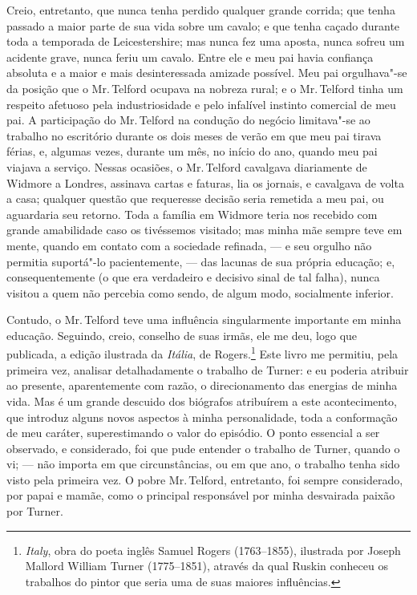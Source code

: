 Creio, entretanto, que nunca tenha perdido qualquer grande corrida;
que tenha passado a maior parte de sua vida sobre um cavalo; e que tenha
caçado durante toda a temporada de Leicestershire; mas nunca fez uma
aposta, nunca sofreu um acidente grave, nunca feriu um cavalo. Entre ele
e meu pai havia confiança absoluta e a maior e mais desinteressada
amizade possível. Meu pai orgulhava"-se da posição que o Mr.\,Telford
ocupava na nobreza rural; e o Mr.\,Telford tinha um respeito afetuoso pela
industriosidade e pelo infalível instinto comercial de meu pai. A
participação do Mr.\,Telford na condução do negócio limitava"-se ao
trabalho no escritório durante os dois meses de verão em que meu pai
tirava férias, e, algumas vezes, durante um mês, no início do ano,
quando meu pai viajava a serviço. Nessas ocasiões, o Mr.\,Telford
cavalgava diariamente de Widmore a Londres, assinava cartas e faturas,
lia os jornais, e cavalgava de volta a casa; qualquer questão que
requeresse decisão seria remetida a meu pai, ou aguardaria seu retorno.
Toda a família em Widmore teria nos recebido com grande amabilidade caso
os tivéssemos visitado; mas minha mãe sempre teve em mente, quando em
contato com a sociedade refinada, --- e seu orgulho não permitia
suportá"-lo pacientemente, --- das lacunas de sua própria educação; e,
consequentemente (o que era verdadeiro e decisivo sinal de tal falha),
nunca visitou a quem não percebia como sendo, de algum modo, socialmente
inferior.

Contudo, o Mr.\,Telford teve uma influência singularmente importante em
minha educação. Seguindo, creio, conselho de suas irmãs, ele me deu,
logo que publicada, a edição ilustrada da \textit{Itália}, de
Rogers.\footnote{\textit{Italy}, obra do poeta inglês Samuel Rogers
  (1763--1855), ilustrada por Joseph Mallord William Turner (1775--1851),
  através da qual Ruskin conheceu os trabalhos do pintor que seria uma
  de suas maiores influências.} Este livro me permitiu,
pela primeira vez, analisar detalhadamente o trabalho de Turner: e eu
poderia atribuir ao presente, aparentemente com razão, o direcionamento
das energias de minha vida. Mas é um grande descuido dos biógrafos
atribuírem a este acontecimento, que introduz alguns novos aspectos à
minha personalidade, toda a conformação de meu caráter, superestimando o
valor do episódio. O ponto essencial a ser observado, e considerado, foi
que pude entender o trabalho de Turner, quando o vi; --- não importa em
que circunstâncias, ou em que ano, o trabalho tenha sido visto pela
primeira vez. O pobre Mr.\,Telford, entretanto, foi sempre considerado,
por papai e mamãe, como o principal responsável por minha desvairada
paixão por Turner.

